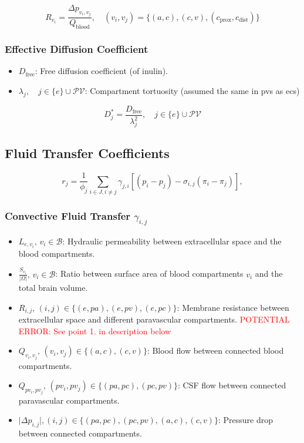 \documentclass{article}
\theoremstyle{definition}
\theoremstyle{plain}
\theoremstyle{remark}
\newcommand{\ISSUE}[1]{\textcolor{red}{POTENTIAL ERROR: #1}}
\begin{document}
\begin{equation}
    R_{v_{i}} = \frac{\Delta p_{v_i, v_j}}{Q_{\text{blood}}}, \quad (v_i, v_j) = \{(a, c), (c, v), (c_\text{prox}, c_\text{dist})\}
\label{eq: resistance vascular} 
\end{equation}


\subsubsection*{Effective Diffusion Coefficient}
\begin{itemize}
    \item \( D_{\text{free}} \): Free diffusion coefficient (of inulin).
    \item \( \lambda_j, \quad j \in \{e \} \cup \mathcal{PV} \): Compartment tortuosity (assumed the same in pvs as ecs)
\end{itemize}

\begin{equation}
    D_j^* = \frac{D_{\text{free}}}{\lambda_j^2}, \quad j \in \{e \} \cup \mathcal{PV} 
\label{eq: effective diffusion} 
\end{equation}


\subsection*{Fluid Transfer Coefficients}
\begin{equation}
    r_j = \frac{1}{\phi_j}\sum_{i\in J, i\neq j} \gamma_{j , i} \left[(p_i - p_j)-\sigma_{i,j}(\pi_i-\pi_j)\right],
\end{equation} 

\subsubsection*{Convective Fluid Transfer \( \gamma_{i, j} \)}
\begin{itemize}
    \item $L_{e, v_i}, \, v_i\in\mathcal{B}$: Hydraulic permeability between extracellular space and the blood compartments. 
    \item $\frac{S_{v_i}}{\left| \Omega \right|}, \, v_i \in \mathcal{B}$: Ratio between surface area of blood compartments \( v_i \) and the total brain volume.
    \item \( R_{i, j}, \, (i, j) \in \{(e, pa), (e, pv), (e, pc)\} \): Membrane resistance between extracellular space and different paravascular compartments. \ISSUE{See point 1. in description below}
    \item $Q_{v_i, v_j}, \, (v_i, v_j) \in \{(a, c), (c, v)\}$: Blood flow between connected blood compartments.
    \item $Q_{pv_i, pv_j}, \, (pv_i, pv_j) \in \{(pa, pc), (pc, pv) \}$: CSF flow between connected paravascular compartments.
    \item $\lvert \Delta p_{i, j} \rvert, (i, j) \in \{(pa, pc), (pc, pv), (a, c), (c, v)\}$: Pressure drop between connected compartments.
\end{itemize}
\end{document}
